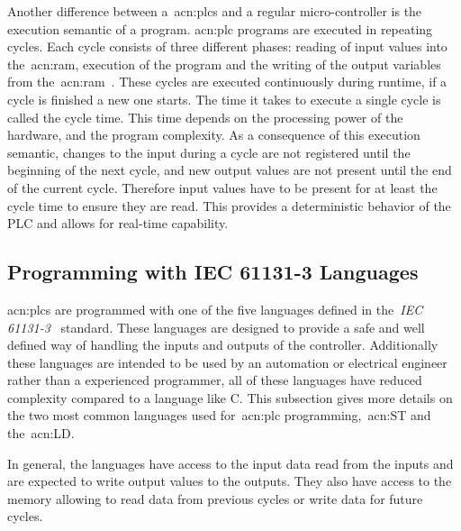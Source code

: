 Another difference between a~\acrshort{acn:plc}s and a regular micro-controller is the execution semantic of a program.
\acrshort{acn:plc} programs are executed in repeating cycles.
Each cycle consists of three different phases: reading of input values into the~\acrshort{acn:ram}, execution of the program and the writing of the output variables from the~\acrshort{acn:ram}~\cite[p.~75]{BOLTON200653}.
These cycles are executed continuously during runtime, if a cycle is finished a new one starts.
The time it takes to execute a single cycle is called the cycle time.
This time depends on the processing power of the hardware, and the program complexity.
As a consequence of this execution semantic, changes to the input during a cycle are not registered until the beginning of the next cycle, and new output values are not present until the end of the current cycle.
Therefore input values have to be present for at least the cycle time to ensure they are read.
This provides a deterministic behavior of the PLC and allows for real-time capability.

\subsection{Programming with IEC 61131-3 Languages}

\acrshort{acn:plc}s are programmed with one of the five languages defined in the~\textit{IEC 61131-3}~\cite{Plcopen:61131-3} standard.
These languages are designed to provide a safe and well defined way of handling the inputs and outputs of the controller.
Additionally these languages are intended to be used by an automation or electrical engineer rather than a experienced programmer, all of these languages have reduced complexity compared to a language like C.
This subsection gives more details on the two most common languages used for~\acrshort{acn:plc} programming,~\acrfull{acn:ST} and the~\acrfull{acn:LD}.

In general, the languages have access to the input data read from the inputs and are expected to write output values to the outputs.
They also have access to the memory allowing to read data from previous cycles or write data for future cycles.

